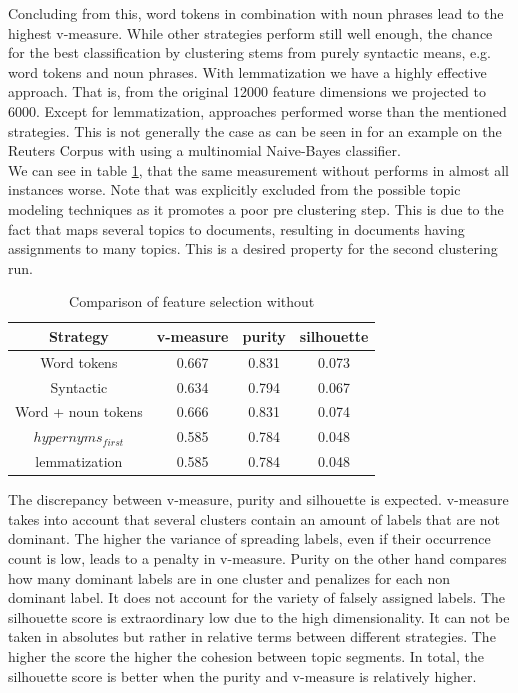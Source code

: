Concluding from this, word tokens in combination with noun phrases lead to the highest v-measure. While other strategies perform still well enough, the chance for the best classification by clustering stems from purely syntactic means, e.g. word tokens and noun phrases. With \wordnet{} lemmatization we have a highly effective approach. That is, from the original 12000 feature dimensions we projected to 6000. Except for lemmatization, \wordnet{} approaches performed worse than the mentioned strategies. This is not generally the case as can be seen in \cite{TopicClassificationReuters2002} for an example on the Reuters Corpus with \wordnet{} using a multinomial Naive-Bayes classifier.\\
We can see in table \ref{comparison_single_without_lsa}, that the same measurement without \lsa{} performs in almost all instances worse. Note that \lda{} was explicitly excluded from the possible topic modeling techniques as it promotes a poor pre clustering step. This is due to the fact that \lda{} maps several topics to documents, resulting in documents having assignments to many topics. This is a desired property for the second clustering run.

  \begin{table}\label{comparison_single_without_lsa}
    \begin{tabular}{ c | c | c | c }
      Strategy    & v-measure & purity  & silhouette \\ \hline
      Word tokens & 0.667     & 0.831   & 0.073      \\
      Syntactic   & 0.634     & 0.794     & 0.067 \\
      Word + noun tokens & 0.666   & 0.831     & 0.074 \\
      \wordnet{} $hypernyms_{first}$ & 0.585   & 0.784     & 0.048 \\
      \wordnet{} lemmatization   & 0.585   & 0.784     & 0.048 \\
    \end{tabular}
    \caption{Comparison of feature selection without \lsa{}}
  \end{table}

The discrepancy between v-measure, purity and silhouette is expected. v-measure takes into account that several clusters contain an amount of labels that are not dominant. The higher the variance of spreading labels, even if their occurrence count is low, leads to a penalty in v-measure. Purity on the other hand compares how many dominant labels are in one cluster and penalizes for each non dominant label. It does not account for the variety of falsely assigned labels. The silhouette score is extraordinary low due to the high dimensionality. It can not be taken in absolutes but rather in relative terms between different strategies. The higher the score the higher the cohesion between topic segments. In total, the silhouette score is better when the purity and v-measure is relatively higher.

